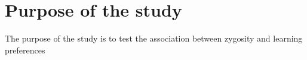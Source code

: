 \section{Purpose of the study}\label{purpose-of-the-study}

The purpose of the study is to test the association between zygosity and
learning preferences \cite{HillGoldsmith:1991uf}

\hypertarget{refs}{}
